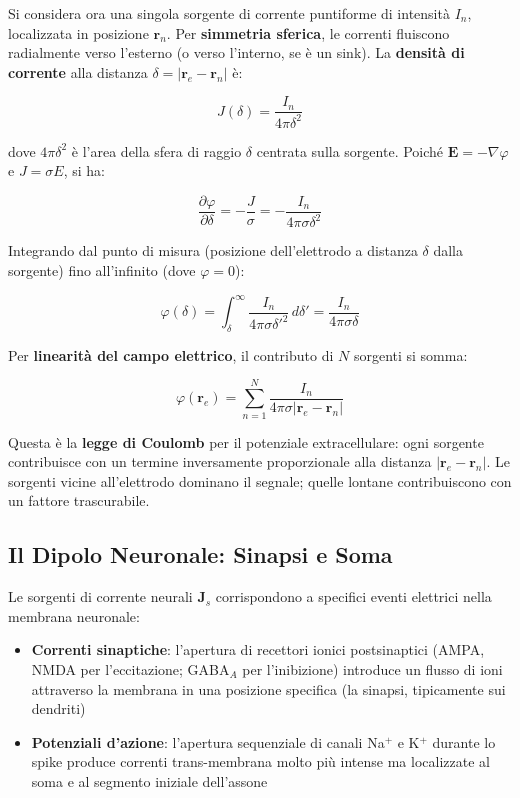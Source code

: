 Si considera ora una singola sorgente di corrente puntiforme di intensità $I_n$, localizzata in posizione $\mathbf{r}_n$. Per \textbf{simmetria sferica}, le correnti fluiscono radialmente verso l'esterno (o verso l'interno, se è un sink). La \textbf{densità di corrente} alla distanza $\delta = |\mathbf{r}_e - \mathbf{r}_n|$ è:

$$ J(\delta) = \frac{I_n}{4 \pi \delta^2} $$

dove $4\pi\delta^2$ è l'area della sfera di raggio $\delta$ centrata sulla sorgente. Poiché $\mathbf{E} = -\nabla\varphi$ e $J = \sigma E$, si ha:

$$ \frac{\partial \varphi}{\partial \delta} = -\frac{J}{\sigma} = -\frac{I_n}{4\pi\sigma\delta^2} $$

Integrando dal punto di misura (posizione dell'elettrodo a distanza $\delta$ dalla sorgente) fino all'infinito (dove $\varphi = 0$):

$$ \varphi(\delta) = \int_{\delta}^{\infty} \frac{I_n}{4\pi\sigma\delta'^2} \, d\delta' = \frac{I_n}{4\pi\sigma\delta} $$

Per \textbf{linearità del campo elettrico}, il contributo di $N$ sorgenti si somma:

$$ \varphi(\mathbf{r}_e) = \sum_{n=1}^{N} \frac{I_n}{4\pi\sigma |\mathbf{r}_e - \mathbf{r}_n|} $$

Questa è la \textbf{legge di Coulomb} per il potenziale extracellulare: ogni sorgente contribuisce con un termine inversamente proporzionale alla distanza $|\mathbf{r}_e - \mathbf{r}_n|$. Le sorgenti vicine all'elettrodo dominano il segnale; quelle lontane contribuiscono con un fattore trascurabile.


\subsection{Il Dipolo Neuronale: Sinapsi e Soma}

Le sorgenti di corrente neurali $\mathbf{J}_s$ corrispondono a specifici eventi elettrici nella membrana neuronale:

\begin{itemize}
    \item \textbf{Correnti sinaptiche}: l'apertura di recettori ionici postsinaptici (AMPA, NMDA per l'eccitazione; GABA$_A$ per l'inibizione) introduce un flusso di ioni attraverso la membrana in una posizione specifica (la sinapsi, tipicamente sui dendriti)
    \item \textbf{Potenziali d'azione}: l'apertura sequenziale di canali Na$^+$ e K$^+$ durante lo spike produce correnti trans-membrana molto più intense ma localizzate al soma e al segmento iniziale dell'assone
\end{itemize}

